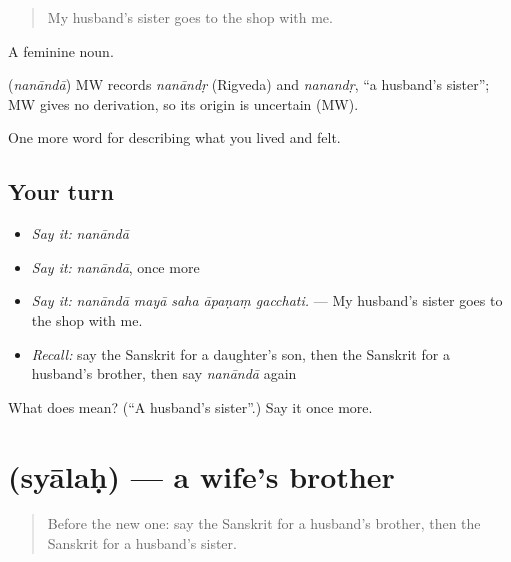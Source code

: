 \begin{quote}
My husband's sister goes to the shop with me.
\end{quote}

A feminine noun.

\begin{cousinweb}
\textbf{} (\emph{nanāndā}) MW records \emph{nanāndṛ} (Rigveda) and \emph{nanandṛ}, \textquotedblleft{}a husband's sister\textquotedblright{}; MW gives no derivation, so its origin is uncertain (MW).
\end{cousinweb}

\begin{grammarlens}[title={What you've built}]
One more word for describing what you lived and felt.
\end{grammarlens}

\subsection*{Your turn}
\begin{itemize}
\raggedright
  \item \emph{Say it:} \emph{nanāndā}
  \item \emph{Say it:} \emph{nanāndā}, once more
  \item \emph{Say it:} \emph{nanāndā mayā saha āpaṇaṃ gacchati.} — My husband's sister goes to the shop with me.
  \item \emph{Recall:} say the Sanskrit for a daughter's son, then the Sanskrit for a husband's brother, then say \emph{nanāndā} again
\end{itemize}

\begin{tcolorbox}[breakable,colback=teal!4,colframe=teal!35!black,title={Before you move on}]
What does  mean? (\textquotedblleft{}A husband's sister\textquotedblright{}.) Say it once more.
\end{tcolorbox}
\section[\texorpdfstring{\sk{स्यालः} (syālaḥ)}{स्यालः (syālaḥ)}]{ (syālaḥ) — a wife's brother}

\label{lesson:SA-C500-syalah}



\begin{quote}
Before the new one: say the Sanskrit for a husband's brother, then the Sanskrit for a husband's sister.
\end{quote}

